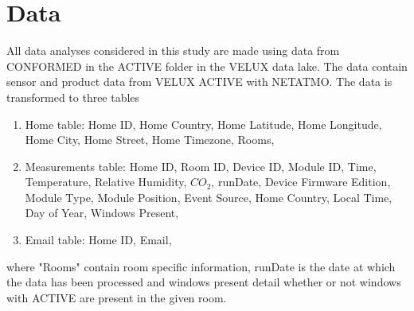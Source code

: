 \documentclass[fleqn,usenatbib,nofootinbib]{revtex4-2}
\begin{document}
	\section{Data}
	All data analyses considered in this study are made using data from CONFORMED in the ACTIVE folder in the VELUX data lake. The data contain sensor and product data from VELUX ACTIVE with NETATMO. The data is transformed to three tables
	\begin{enumerate}
		\item Home table: Home ID, Home Country, Home Latitude, Home Longitude, Home City, Home Street, Home Timezone, Rooms,
		\item Measurements table: Home ID, Room ID, Device ID, Module ID, Time, Temperature, Relative Humidity, $CO_2$, runDate, Device Firmware Edition, Module Type, Module Position, Event Source, Home Country, Local Time, Day of Year, Windows Present,
		\item Email table: Home ID, Email,
	\end{enumerate}
	where "Rooms" contain room specific information, runDate is the date at which the data has been processed and windows present detail whether or not windows with ACTIVE are present in the given room.
	
\end{document}
